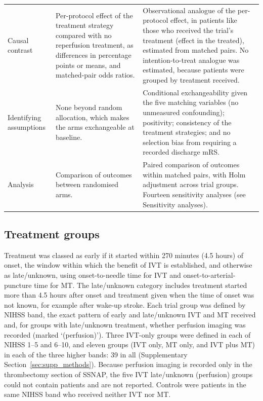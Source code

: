 \begin{table}[H]
\begin{tabular}{p{2.8cm} p{6.6cm} p{6.6cm}}
\addlinespace
Causal contrast & Per-protocol effect of the treatment strategy compared with no reperfusion treatment, as differences in percentage points or means, and matched-pair odds ratios. & Observational analogue of the per-protocol effect, in patients like those who received the trial's treatment (effect in the treated), estimated from matched pairs. No intention-to-treat analogue was estimated, because patients were grouped by treatment received. \\
\addlinespace
Identifying assumptions & None beyond random allocation, which makes the arms exchangeable at baseline. & Conditional exchangeability given the five matching variables (no unmeasured confounding); positivity; consistency of the treatment strategies; and no selection bias from requiring a recorded discharge mRS. \\
\addlinespace
Analysis & Comparison of outcomes between randomised arms. & Paired comparison of outcomes within matched pairs, with Holm adjustment across trial groups. Fourteen sensitivity analyses (see Sensitivity analyses). \\
\bottomrule
\end{tabular}
\end{table}

\subsection{Treatment groups}

Treatment was classed as early if it started within 270 minutes (4.5 hours) of onset, the window within which the benefit of IVT is established\cite{emberson_effect_2014}, and otherwise as late/unknown, using onset-to-needle time for IVT and onset-to-arterial-puncture time for MT. The late/unknown category includes treatment started more than 4.5 hours after onset and treatment given when the time of onset was not known, for example after wake-up stroke. Each trial group was defined by NIHSS band, the exact pattern of early and late/unknown IVT and MT received and, for groups with late/unknown treatment, whether perfusion imaging was recorded (marked `(perfusion)'). Three IVT-only groups were defined in each of NIHSS 1--5 and 6--10, and eleven groups (IVT only, MT only, and IVT plus MT) in each of the three higher bands: 39 in all (Supplementary Section~\ref{sec:supp_methods}). Because perfusion imaging is recorded only in the thrombectomy section of SSNAP, the five IVT late/unknown (perfusion) groups could not contain patients and are not reported. Controls were patients in the same NIHSS band who received neither IVT nor MT.

